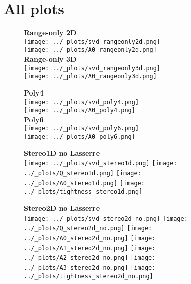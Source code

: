 \documentclass[11pt]{article}
\begin{document}
\clearpage
\FloatBarrier
\section{All plots}

\begin{figure}[h!]
  \centering
  \textbf{\large{Range-only 2D}} \\
  \texttt{[image: ../\_plots/svd\_rangeonly2d.png]} \\
  \texttt{[image: ../\_plots/A0\_rangeonly2d.png]} \\
  \vspace{3em}
  \textbf{\large{Range-only 3D}} \\
  \texttt{[image: ../\_plots/svd\_rangeonly3d.png]} \\
  \texttt{[image: ../\_plots/A0\_rangeonly3d.png]} \\
\end{figure}
\begin{figure}[h!]
  \centering
  \textbf{\large{Poly4}} \\
  \texttt{[image: ../\_plots/svd\_poly4.png]} \\
  \texttt{[image: ../\_plots/A0\_poly4.png]} \\
  \vspace{3em}
  \textbf{\large{Poly6}} \\
  \texttt{[image: ../\_plots/svd\_poly6.png]} \\
  \texttt{[image: ../\_plots/A0\_poly6.png]} \\
\end{figure}

\begin{figure}[h!]
  \centering
  \textbf{\large{Stereo1D no Lasserre}} \\
  \vspace{2em}
  \texttt{[image: ../\_plots/svd\_stereo1d.png]}
  \texttt{[image: ../\_plots/Q\_stereo1d.png]}
  \texttt{[image: ../\_plots/A0\_stereo1d.png]}
  \texttt{[image: ../\_plots/tightness\_stereo1d.png]}
\end{figure}

\begin{figure}[h!]
  \centering
  \textbf{\large{Stereo2D no Lasserre}} \\
  \vspace{2em}
  \texttt{[image: ../\_plots/svd\_stereo2d\_no.png]}
  \texttt{[image: ../\_plots/Q\_stereo2d\_no.png]}
  \texttt{[image: ../\_plots/A0\_stereo2d\_no.png]}
  \texttt{[image: ../\_plots/A1\_stereo2d\_no.png]}
  \texttt{[image: ../\_plots/A2\_stereo2d\_no.png]}
  \texttt{[image: ../\_plots/A3\_stereo2d\_no.png]}
  \texttt{[image: ../\_plots/tightness\_stereo2d\_no.png]}
\end{figure}
\end{document}
